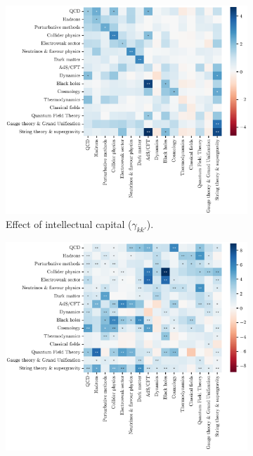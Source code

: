 \documentclass{article}
\begin{document}
\begin{figure}[h]
\hspace{-2em}
\begin{subfigure}{.5\textwidth}
    \includegraphics[width=1\textwidth]{plots/ei_gamma_control_nu.eps}
    \caption{Effect of intellectual capital ($\gamma_{kk'}$).}
    \label{fig:intellectual-capital-effect}
\end{subfigure}%
\begin{subfigure}{.5\textwidth}
    \includegraphics[width=1\textwidth]{plots/ei_delta_control_nu.eps}

\end{subfigure}
\end{figure}
\end{document}
